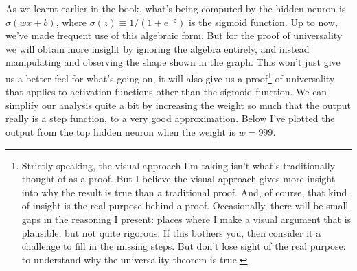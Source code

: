 \documentclass[a4paper,twoside,10pt]{book}
\begin{document}
As we learnt earlier in the book, what's being computed by the hidden neuron is $\sigma(wx+b)$, where $\sigma(z)\equiv1/(1+e^{-z})$ is the sigmoid function. Up to now, we've made frequent use of this algebraic form. But for the proof of universality we will obtain more insight by ignoring the algebra entirely, and instead manipulating and observing the shape shown in the graph. This won't just give us a better feel for what's going on, it will also give us a proof\footnote{Strictly speaking, the visual approach I'm taking isn't what's traditionally thought of as a proof. But I believe the visual approach gives more insight into why the result is true than a traditional proof. And, of course, that kind of insight is the real purpose behind a proof. Occasionally, there will be small gaps in the reasoning I present: places where I make a visual argument that is plausible, but not quite rigorous. If this bothers you, then consider it a challenge to fill in the missing steps. But don't lose sight of the real purpose: to understand why the universality theorem is true.} of universality that applies to activation functions other than the sigmoid function.
%
%
%
%
We can simplify our analysis quite a bit by increasing the weight so much that the output really is a step function, to a very good approximation. Below I've plotted the output from the top hidden neuron when the weight is $w=999$. %
\end{document}

